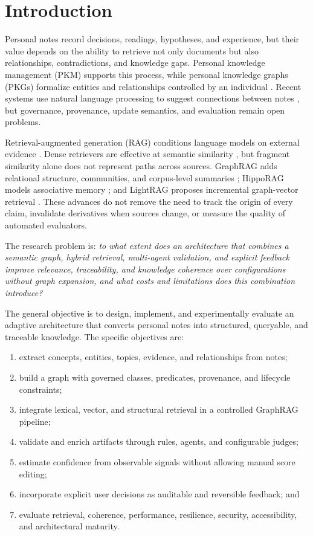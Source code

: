 \documentclass{sbc2023}
\begin{document}
\section{Introduction}
\label{sec:intro}

Personal notes record decisions, readings, hypotheses, and experience, but their value depends on
the ability to retrieve not only documents but also relationships, contradictions, and knowledge
gaps. Personal knowledge management (PKM) supports this process, while personal knowledge graphs
(PKGs) formalize entities and relationships controlled by an individual
\cite{balog2019pkg,chakraborty2023survey,skjaeveland2024ecosystem}. Recent systems use natural
language processing to suggest connections between notes \cite{fraga2023automatic,
fraga2024connections}, but governance, provenance, update semantics, and evaluation remain open
problems.

Retrieval-augmented generation (RAG) conditions language models on external evidence
\cite{lewis2020rag}. Dense retrievers are effective at semantic similarity
\cite{karpukhin2020dpr}, but fragment similarity alone does not represent paths across sources.
GraphRAG adds relational structure, communities, and corpus-level summaries
\cite{edge2024graphrag}; HippoRAG models associative memory \cite{gutierrez2024hipporag}; and
LightRAG proposes incremental graph-vector retrieval \cite{guo2024lightrag}. These advances do not
remove the need to track the origin of every claim, invalidate derivatives when sources change,
or measure the quality of automated evaluators.

The research problem is: \textit{to what extent does an architecture that combines a semantic
graph, hybrid retrieval, multi-agent validation, and explicit feedback improve relevance,
traceability, and knowledge coherence over configurations without graph expansion, and what costs
and limitations does this combination introduce?}

The general objective is to design, implement, and experimentally evaluate an adaptive
architecture that converts personal notes into structured, queryable, and traceable knowledge.
The specific objectives are:

\begin{enumerate}
  \item extract concepts, entities, topics, evidence, and relationships from notes;
  \item build a graph with governed classes, predicates, provenance, and lifecycle constraints;
  \item integrate lexical, vector, and structural retrieval in a controlled GraphRAG pipeline;
  \item validate and enrich artifacts through rules, agents, and configurable judges;
  \item estimate confidence from observable signals without allowing manual score editing;
  \item incorporate explicit user decisions as auditable and reversible feedback; and
  \item evaluate retrieval, coherence, performance, resilience, security, accessibility, and
  architectural maturity.
\end{enumerate}
\end{document}
